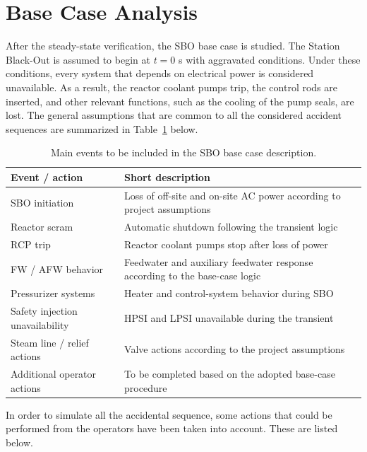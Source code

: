 \documentclass[a4paper,11pt]{article}
\numberwithin{subsubsection}{subsection}
\numberwithin{subsection}{section}
\newcommand{\tabref}[1]{Table~\ref{#1}}
\begin{document}
\section{Base Case Analysis}

After the steady-state verification, the SBO base case is studied. The Station Black-Out is assumed to begin at $t=0$ s with aggravated conditions. 
Under these conditions, every system that depends on electrical power is considered unavailable. 
As a result, the reactor coolant pumps trip, the control rods are inserted, and other relevant functions, such as the cooling of the pump seals, are lost. 
The general assumptions that are common to all the considered accident sequences are summarized in \tabref{tab:SBO_events} below.

\begin{table}[H]
\centering
\caption{Main events to be included in the SBO base case description.}
\label{tab:SBO_events}
\begin{tabular}{p{4.5cm} p{10.5cm}}
\toprule
\textbf{Event / action} & \textbf{Short description} \\
\midrule
SBO initiation & Loss of off-site and on-site AC power according to project assumptions \\
Reactor scram & Automatic shutdown following the transient logic \\
RCP trip & Reactor coolant pumps stop after loss of power \\
FW / AFW behavior & Feedwater and auxiliary feedwater response according to the base-case logic \\
Pressurizer systems & Heater and control-system behavior during SBO \\
Safety injection unavailability & HPSI and LPSI unavailable during the transient \\
Steam line / relief actions & Valve actions according to the project assumptions \\
Additional operator actions & To be completed based on the adopted base-case procedure \\
\bottomrule
\end{tabular}
\end{table}

In order to simulate all the accidental sequence, some actions that 
could be performed from the operators have been taken into account. These are
listed below. 
\end{document}
